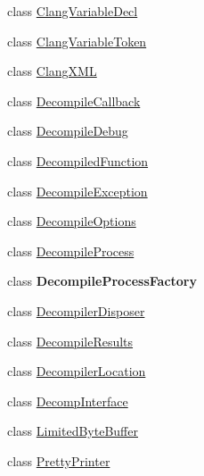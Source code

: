 \begin{DoxyCompactItemize}
class \mbox{\hyperlink{classghidra_1_1app_1_1decompiler_1_1_clang_variable_decl}{Clang\+Variable\+Decl}}
\item 
class \mbox{\hyperlink{classghidra_1_1app_1_1decompiler_1_1_clang_variable_token}{Clang\+Variable\+Token}}
\item 
class \mbox{\hyperlink{classghidra_1_1app_1_1decompiler_1_1_clang_x_m_l}{Clang\+X\+ML}}
\item 
class \mbox{\hyperlink{classghidra_1_1app_1_1decompiler_1_1_decompile_callback}{Decompile\+Callback}}
\item 
class \mbox{\hyperlink{classghidra_1_1app_1_1decompiler_1_1_decompile_debug}{Decompile\+Debug}}
\item 
class \mbox{\hyperlink{classghidra_1_1app_1_1decompiler_1_1_decompiled_function}{Decompiled\+Function}}
\item 
class \mbox{\hyperlink{classghidra_1_1app_1_1decompiler_1_1_decompile_exception}{Decompile\+Exception}}
\item 
class \mbox{\hyperlink{classghidra_1_1app_1_1decompiler_1_1_decompile_options}{Decompile\+Options}}
\item 
class \mbox{\hyperlink{classghidra_1_1app_1_1decompiler_1_1_decompile_process}{Decompile\+Process}}
\item 
class {\bfseries Decompile\+Process\+Factory}
\item 
class \mbox{\hyperlink{classghidra_1_1app_1_1decompiler_1_1_decompiler_disposer}{Decompiler\+Disposer}}
\item 
class \mbox{\hyperlink{classghidra_1_1app_1_1decompiler_1_1_decompile_results}{Decompile\+Results}}
\item 
class \mbox{\hyperlink{classghidra_1_1app_1_1decompiler_1_1_decompiler_location}{Decompiler\+Location}}
\item 
class \mbox{\hyperlink{classghidra_1_1app_1_1decompiler_1_1_decomp_interface}{Decomp\+Interface}}
\item 
class \mbox{\hyperlink{classghidra_1_1app_1_1decompiler_1_1_limited_byte_buffer}{Limited\+Byte\+Buffer}}
\item 
class \mbox{\hyperlink{classghidra_1_1app_1_1decompiler_1_1_pretty_printer}{Pretty\+Printer}}
\end{DoxyCompactItemize}
